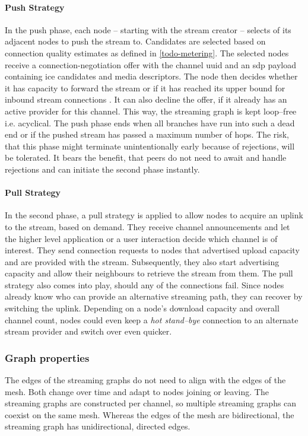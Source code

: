 \paragraph{Push Strategy}
In the push phase, each node – starting with the stream creator – selects \outStreamConnections of its adjacent nodes to push the stream to. Candidates are selected based on connection quality estimates as defined in \ref{todo-metering}. The selected nodes receive a \gls{connection-negotiation} offer with the channel \gls{uuid} and an \gls{sdp} payload containing \gls{ice} candidates and media descriptors. The node then decides whether it has capacity to forward the stream or if it has reached its upper bound for inbound stream connections \inStreamConnections. It can also decline the offer, if it already has an active provider for this channel. This way, the streaming graph is kept loop–free i.e. acyclical. The push phase ends when all branches have run into such a dead end or if the pushed stream has passed a maximum number of hops. The risk, that this phase might terminate unintentionally early because of rejections, will be tolerated. It bears the benefit, that peers do not need to await and handle rejections and can initiate the second phase instantly.

\paragraph{Pull Strategy}
In the second phase, a pull strategy is applied to allow nodes to acquire an uplink to the stream, based on demand. They receive channel announcements and let the higher level application or a user interaction decide which channel is of interest. They send connection requests to nodes that advertised upload capacity and are provided with the stream. Subsequently, they also start advertising capacity and allow their neighbours to retrieve the stream from them. The pull strategy also comes into play, should any of the connections fail. Since nodes already know who can provide an alternative streaming path, they can recover by switching the uplink. Depending on a node's download capacity and overall channel count, nodes could even keep a \textit{hot stand–bye} connection to an alternate stream provider and switch over even quicker.


\subsubsection{Graph properties}

The edges of the streaming graphs do not need to align with the edges of the mesh. Both change over time and adapt to nodes joining or leaving. The streaming graphs are constructed per channel, so multiple streaming graphs can coexist on the same mesh. Whereas the edges of the mesh are bidirectional, the streaming graph has unidirectional, directed edges.
